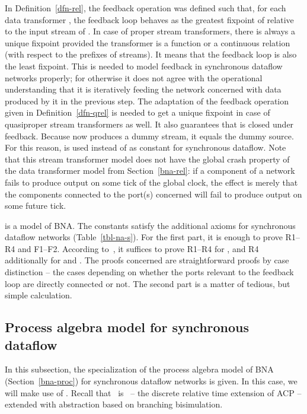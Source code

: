 \documentclass[fleqn]{llncs}
\begin{document}
\begin{table}[tb]
In Definition~\ref{dfn-rel}, the feedback operation was defined such
that, for each data transformer , the feedback loop behaves as the
greatest fixpoint of  relative to the input stream of .
In case of proper stream transformers, there is always a unique
fixpoint provided the transformer is a function or a continuous
relation (with respect to the prefixes of streams).
It means that the feedback loop is also the least fixpoint.
This is needed to model feedback in synchronous dataflow networks
properly; for otherwise it does not agree with the operational
understanding that it is iteratively feeding the network concerned with
data produced by it in the previous step.
The adaptation of the feedback operation given in
Definition~\ref{dfn-qrel} is needed to get a unique fixpoint in
case of quasiproper stream transformers as well.
It also guarantees that  is closed under feedback.
Because  now produces a dummy stream, it equals the
dummy source.
For this reason,  is used instead of  as constant
for synchronous dataflow.
Note that this stream transformer model does not have the global crash
property of the data transformer model from Section~\ref{bna-rel}: if a
component of a network fails to produce output on some tick of the
global clock, the effect is merely that the components connected to the
port(s) concerned will fail to produce output on some future tick.


\bthm
 is a model of BNA.
The constants  satisfy the additional
axioms for synchronous dataflow networks (Table~\ref{tbl-na-s}).
\ethm
\bproof
For the first part, it is enough to prove R1--R4 and F1--F2.
According to~\cite{CS88,CS89}, it suffices to prove R1--R4 for ,
and R4 additionally for  and .
The proofs concerned are straightforward proofs by case distinction --
the cases depending on whether the ports relevant to the feedback loop
are directly connected or not.
The second part is a matter of tedious, but simple calculation.
\eproof

\subsection{Process algebra model for synchronous dataflow}
\label{na-s-sproc}
In this subsection, the specialization of the process algebra model of
BNA (Section~\ref{bna-proc}) for synchronous dataflow networks is given.
In this case, we will make use of \acpdrtt.
Recall that \acpdrtt\ is \acpdrt\ -- the discrete relative time
extension of ACP -- extended with abstraction based on branching
bisimulation.


\end{table}
\end{document}
